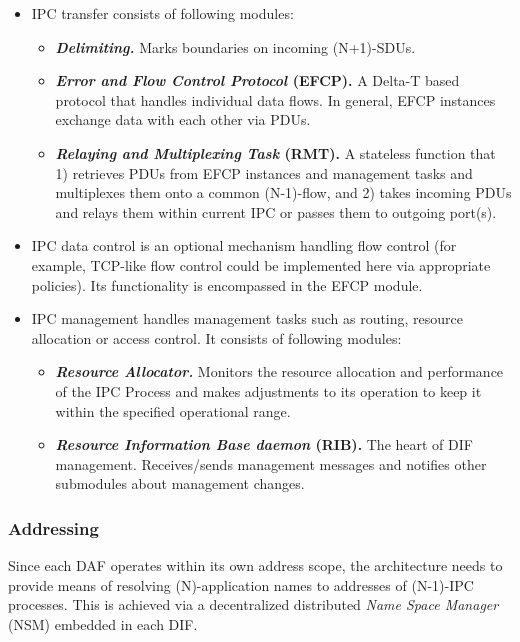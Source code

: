                 \begin{itemize}
                    \item IPC transfer consists of following modules:
                    \begin{itemize}
                        \item \textbf{\emph{Delimiting.}} Marks boundaries on incoming (N+1)-SDUs.
                        \item \textbf{\emph{Error and Flow Control Protocol} (EFCP).} A Delta-T \cite{deltat} based protocol that handles individual data flows. In general, EFCP instances exchange data with each other via PDUs.
                        \item \textbf{\emph{Relaying and Multiplexing Task} (RMT).} A stateless function that 1) retrieves PDUs from EFCP instances and management tasks and multiplexes them onto a common (N-1)-flow, and 2) takes incoming PDUs and relays them within current IPC or passes them to outgoing port(s).
                    \end{itemize}
                    \item IPC data control is an optional mechanism handling flow control (for example, TCP-like flow control could be implemented here via appropriate policies). Its functionality is encompassed in the EFCP module.
                    \item IPC management handles management tasks such as routing, resource allocation or access control. It consists of following modules:
                    \begin{itemize}
                        \item \textbf{\emph{Resource Allocator.}} Monitors the resource allocation and performance of the IPC Process and makes adjustments to its operation to keep it within the specified operational range.
                        \item \textbf{\emph{Resource Information Base daemon} (RIB).} The heart of DIF management. Receives/sends management messages and notifies other submodules about management changes.
                    \end{itemize}
                \end{itemize}


            \subsubsection{Addressing}

                Since each DAF operates within its own address scope, the architecture needs to provide means of resolving (N)-application names to addresses of (N-1)-IPC processes. This is achieved via a decentralized distributed \emph{Name Space Manager} (NSM) embedded in each DIF.

